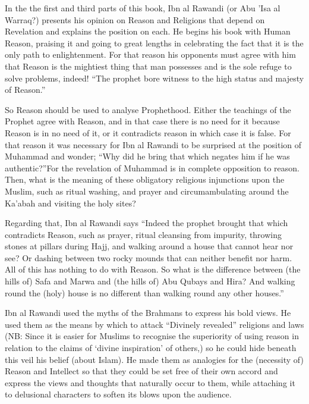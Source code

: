 \documentclass[12pt]{book}
\begin{document}

In the the first and third parts of this book, Ibn al Rawandi (or Abu ’Isa al
Warraq?) presents his opinion on Reason and Religions that depend on Revelation
and explains the position on each. He begins his book with Human Reason,
praising it and going to great lengths in celebrating the fact that it is the
only path to enlightenment. For that reason his opponents must agree with him
that Reason is the mightiest thing that man possesses and is the sole refuge to
solve problems, indeed! “The prophet bore witness to the high status and
majesty of Reason.”\footnotemark


So Reason should be used to analyse Prophethood. Either the teachings of the
Prophet agree with Reason, and in that case there is no need for it because
Reason is in no need of it, or it contradicts reason in which case it is false.
For that reason it was necessary for Ibn al Rawandi to be surprised at the
position of Muhammad and wonder; “Why did he bring that which negates him if he
was authentic?”\footnotemark For the revelation of Muhammad is in complete
opposition to reason. Then, what is the meaning of these obligatory religious
injunctions upon the Muslim, such as ritual washing, and prayer and
circumambulating around the Ka’abah and visiting the holy sites?


Regarding that, Ibn al Rawandi says “Indeed the prophet brought that which
contradicts Reason, such as prayer, ritual cleansing from impurity, throwing
stones at pillars during Hajj, and walking around a house that cannot hear nor
see? Or dashing between two rocky mounds that can neither benefit nor harm. All
of this has nothing to do with Reason. So what is the difference between (the
hills of) Safa and Marwa and (the hills of) Abu Qubays and Hira? And walking
round the (holy) house is no different than walking round any other
houses.”\footnotemark


Ibn al Rawandi used the myths of the Brahmans to express his bold views. He
used them as the means by which to attack “Divinely revealed” religions and
laws (NB: Since it is easier for Muslims to recognise the superiority of using
reason in relation to the claims of ‘divine inspiration’ of others,) so he
could hide beneath this veil his belief (about Islam). He made them as
analogies for the (necessity of) Reason and Intellect so that they could be set
free of their own accord and express the views and thoughts that naturally
occur to them, while attaching it to delusional characters to soften its blows
upon the audience.
\end{document}
